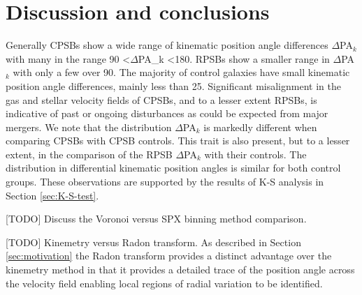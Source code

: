 \section{Discussion and conclusions}
\label{sec:discussion}

Generally CPSBs show a wide range of kinematic position angle differences $\Delta$PA$_{k}$ with many in the range 90 \textless $\Delta$PA\_k \textless 180\textdegree. RPSBs show a smaller range in $\Delta$PA$_{k}$ with only a few over 90\textdegree. The majority of control galaxies have small kinematic position angle differences, mainly less than 25\textdegree. Significant misalignment in the gas and stellar velocity fields of CPSBs, and to a lesser extent RPSBs, is indicative of past or ongoing disturbances as could be expected from major mergers. 
We note that the distribution $\Delta$PA$_{k}$ is markedly different when comparing CPSBs with CPSB controls. This trait is also present, but to a lesser extent, in the comparison of the RPSB  $\Delta$PA$_{k}$ with their controls. The distribution in differential kinematic position angles is similar for both control groups. These observations are supported by the results of K-S analysis in Section \ref{sec:K-S-test}.

[TODO] Discuss the Voronoi versus SPX binning method comparison.

[TODO] Kinemetry versus Radon transform. As described in Section \ref{sec:motivation} the Radon transform provides a distinct advantage over the kinemetry method in that it provides a detailed trace of the position angle across the velocity field enabling local regions of radial variation to be identified. 

